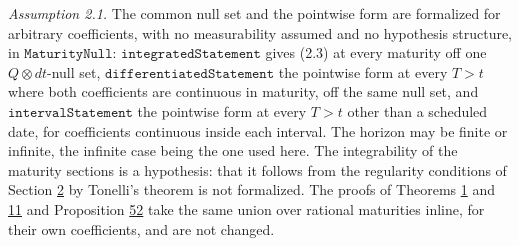 \documentclass[11pt]{article}
\begin{document}
\emph{Assumption 2.1.} The common null set and the pointwise form are formalized for arbitrary coefficients, with no measurability assumed and no hypothesis structure, in \(\texttt{MaturityNull}\): \(\texttt{integratedStatement}\) gives (2.3) at every maturity off one \(Q \otimes dt\)-null set, \(\texttt{differentiatedStatement}\) the pointwise form at every \(T > t\) where both coefficients are continuous in maturity, off the same null set, and \(\texttt{intervalStatement}\) the pointwise form at every \(T > t\) other than a scheduled date, for coefficients continuous inside each interval. The horizon may be finite or infinite, the infinite case being the one used here. The integrability of the maturity sections is a hypothesis: that it follows from the regularity conditions of Section \hyperref[sec:2]{2} by Tonelli's theorem is not formalized. The proofs of Theorems \hyperref[res:Theorem-1]{1} and \hyperref[res:Theorem-11]{11} and Proposition \hyperref[res:Proposition-52]{52} take the same union over rational maturities inline, for their own coefficients, and are not changed.
\end{document}
